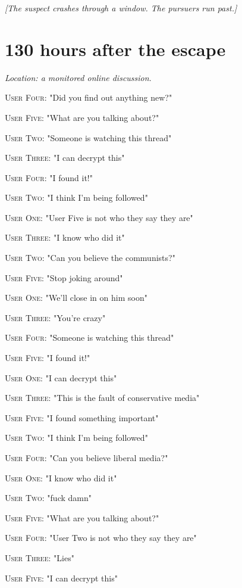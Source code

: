 \documentclass{report}
\begin{document}
\textit{[The suspect crashes through a window. The pursuers run past.]}


\section*{130 \small{hours after the escape}}

\textit{Location: a monitored online discussion}. 

\textsc{User Four}: "Did you find out anything new?" 

\textsc{User Five}: "What are you talking about?" 

\textsc{User Two}: "Someone is watching this thread" 

\textsc{User Three}: "I can decrypt this" 

\textsc{User Four}: "I found it!" 

\textsc{User Two}: "I think I'm being followed" 

\textsc{User One}: "User Five is not who they say they are" 

\textsc{User Three}: "I know who did it" 

\textsc{User Two}: "Can you believe the communists?" 

\textsc{User Five}: "Stop joking around" 

\textsc{User One}: "We'll close in on him soon" 

\textsc{User Three}: "You're crazy" 

\textsc{User Four}: "Someone is watching this thread" 

\textsc{User Five}: "I found it!" 

\textsc{User One}: "I can decrypt this" 

\textsc{User Three}: "This is the fault of conservative media" 

\textsc{User Five}: "I found something important" 

\textsc{User Two}: "I think I'm being followed" 

\textsc{User Four}: "Can you believe liberal media?" 

\textsc{User One}: "I know who did it" 

\textsc{User Two}: "fuck damn" 

\textsc{User Five}: "What are you talking about?" 

\textsc{User Four}: "User Two is not who they say they are" 

\textsc{User Three}: "Lies" 

\textsc{User Five}: "I can decrypt this" 
\end{document}

